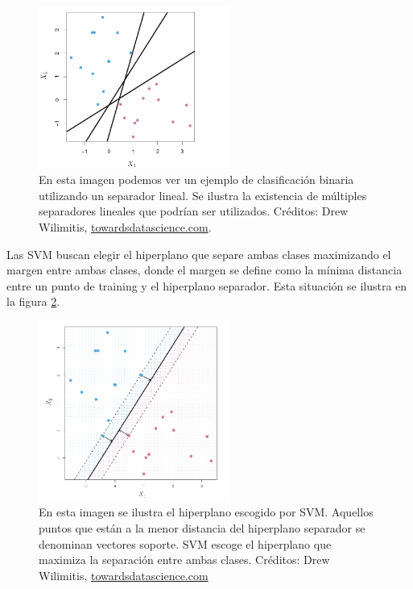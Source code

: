 \begin{figure}[h!]
\begin{center}
  \includegraphics[width=0.56\textwidth]{Kap1/svm1.png} 
\end{center}
\caption{ En esta imagen podemos ver un ejemplo de clasificación binaria utilizando un separador lineal. Se ilustra la existencia de múltiples separadores lineales que podrían ser utilizados. Créditos: Drew Wilimitis, \url{towardsdatascience.com}.}
\label{fig:sv1}
\end{figure}

Las SVM buscan elegir el hiperplano que separe ambas clases maximizando el margen entre ambas clases, donde el margen se define como la mínima distancia entre un punto de training y el hiperplano separador. Esta situación se ilustra en la figura \ref{fig:svm_3}. \\

\begin{figure}[h!]
\begin{center}
  \includegraphics[width=0.56\textwidth]{Kap1/svm3.png} 
  \end{center}
 \caption{En esta imagen se ilustra el hiperplano escogido por SVM. Aquellos puntos que están a la menor distancia del hiperplano separador se denominan vectores soporte. SVM escoge el hiperplano que maximiza la separación entre ambas clases. Créditos: Drew Wilimitis, \url{towardsdatascience.com}}
\label{fig:svm_3}
\end{figure}


